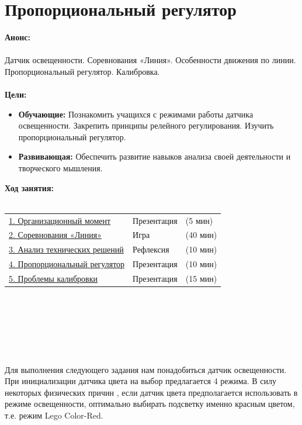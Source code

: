 \chapter{\label{lesson16}Пропорциональный регулятор}
{\bfseries Анонс:}\\\\
Датчик освещенности. Соревнования «Линия». Особенности движения по линии. Пропорциональный регулятор. Калибровка.\\\\
{\bfseries Цели:}
\begin{itemize}
	\item{}{\bfseries Обучающие:} Познакомить учащихся с режимами работы датчика освещенности. Закрепить принципы релейного регулирования. Изучить пропорциональный регулятор.
	\item{}{\bfseries Развивающая:} Обеспечить развитие навыков анализа своей деятельности и творческого мышления.\\
\end{itemize}	
{\bfseries Ход занятия:}\\\\
\begin{tabular}[h!]{lll}
	{\hyperlink{lesson16x1}{1. Организационный момент}}&{Презентация}&{(5 мин)}\\
	{\hyperlink{lesson16x2}{2. Соревнования «Линия»}}&{Игра}&{(40 мин)}\\
	{\hyperlink{lesson16x3}{3. Анализ технических решений}}&{Рефлексия}&{(10 мин)}\\
	{\hyperlink{lesson16x4}{4. Пропорциональный регулятор}}&{Презентация}&{(10 мин)}\\
	{\hyperlink{lesson16x5}{5. Проблемы калибровки}}&{Презентация}&{(15 мин)}\\
\end{tabular}\\\\

{\hypertarget{lesson16x1}{}}\\\\		
\clearpage
{\hypertarget{lesson16x2}{}}\\\\	

Для выполнения следующего задания нам понадобиться датчик освещенности. При инициализации датчика цвета на выбор предлагается 4 режима. В силу некоторых физических причин  , если датчик цвета предполагается использовать в режиме освещенности, оптимально выбирать подсветку именно красным цветом, т.е. режим Lego Color-Red.

